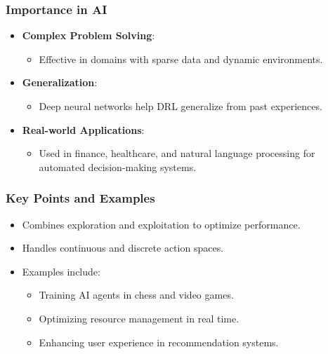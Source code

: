 \documentclass[aspectratio=169]{beamer}
\begin{document}
\begin{frame}[fragile]
    \frametitle{Importance in AI}
    \begin{itemize}
        \item \textbf{Complex Problem Solving}:
            \begin{itemize}
                \item Effective in domains with sparse data and dynamic environments.
            \end{itemize}
        \item \textbf{Generalization}:
            \begin{itemize}
                \item Deep neural networks help DRL generalize from past experiences.
            \end{itemize}
        \item \textbf{Real-world Applications}:
            \begin{itemize}
                \item Used in finance, healthcare, and natural language processing for automated decision-making systems.
            \end{itemize}
    \end{itemize}
\end{frame}

\begin{frame}[fragile]
    \frametitle{Key Points and Examples}
    \begin{itemize}
        \item Combines exploration and exploitation to optimize performance.
        \item Handles continuous and discrete action spaces.
        \item Examples include:
            \begin{itemize}
                \item Training AI agents in chess and video games.
                \item Optimizing resource management in real time.
                \item Enhancing user experience in recommendation systems.
            \end{itemize}
    \end{itemize}
\end{frame}
\end{document}
